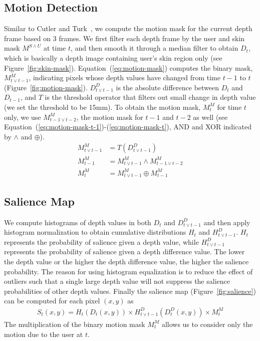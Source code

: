 \documentclass{acm_proc_article-sp}
\begin{document}
\subsection{Motion Detection}
Similar to Cutler and Turk~\cite{cutler1998}, we compute the motion mask for the current depth frame based on 3 frames. We first filter each 
depth frame by the user and skin mask $M^{S\wedge U}$ at time $t$, and then
smooth it through a median filter to obtain $D_t$, which is basically a depth image containing user's skin region only (see Figure~\ref{fig:skin-mask}).
Equation~(\ref{eq:motion-mask}) computes the binary mask, $M_{t\vee t-1}^M$, indicating pixels whose depth values have changed from time $t-1$ to $t$ (Figure~\ref{fig:motion-mask}).
$D_{t\vee t-1}^{D}$ is the absolute difference between $D_t$ and $D_{t-1}$, and $T$ is the threshold operator that filters out small change in depth value 
(we set the threshold to be 15mm). 
To obtain the motion mask, $M_{t}^M$ for time $t$ only, we use $M_{t-1\vee t-2}^M$, the motion mask for $t-1$ and $t-2$ as well (see Equation~(\ref{eq:motion-mask-t-1})-(\ref{eq:motion-mask-t}),
 AND and XOR indicated by $\wedge$ and $\oplus$).
\begin{align}
M_{t\vee t-1}^M &= T(D_{t\vee t-1}^{D}) \label{eq:motion-mask} \\
M_{t-1}^M &= M_{t\vee t-1}^M \wedge M_{t-1\vee t-2}^M \label{eq:motion-mask-t-1}\\
M_{t}^M &= M_{t\vee t-1}^M \oplus M_{t-1}^M \label{eq:motion-mask-t}
\end{align}

\subsection{Salience Map}
We compute histograms of depth values in both $D_t$ and $D_{t\vee t-1}^{D}$ and then apply histogram normalization to obtain cumulative distributions $H_t$ and $H_{t\vee t-1}^D$.
$H_t$ represents the probability of salience given a depth value, while $H_{t\vee t-1}^D$ represents the probability of salience given
a depth difference value. The lower the depth value or the higher the depth difference value, the higher the salience probability. The reason for using
histogram equalization is to reduce the effect of outliers such that a single large depth value will not suppress the salience probabilities of other depth values. 
Finally the salience map (Figure~\ref{fig:salience}) can be computed for each pixel $(x, y)$ as
\begin{align}
S_t(x, y) = H_t(D_t(x, y)) \times H_{t\vee t-1}^D(D_t^D(x, y)) \times M_t^M
\end{align}
The multiplication of the binary motion mask $M_t^M$ allows us to consider only the motion due to the user at $t$.
 
\end{document}
